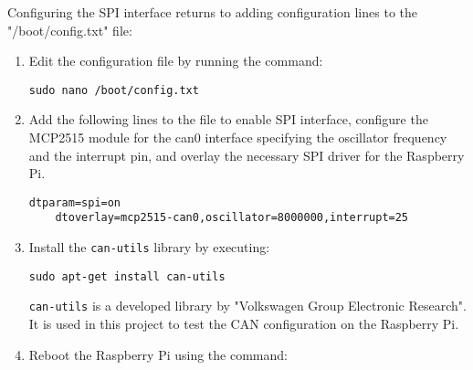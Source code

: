 Configuring the SPI interface returns to adding configuration lines to the "/boot/config.txt" file:
\begin{enumerate}
    \item Edit the configuration file by running the command:
    \begin{adjustwidth}{2em}{0pt}
    \begin{lstlisting}[backgroundcolor=\color{mygray}]
    sudo nano /boot/config.txt
    \end{lstlisting}
    \captionsetup{type=lstlisting}
    \label{lst:nano config}
    \end{adjustwidth}
    
    \item Add the following lines to the file to enable SPI interface, configure the MCP2515 module for the can0 interface specifying the oscillator frequency and the interrupt pin, and overlay the necessary SPI driver for the Raspberry Pi.
    
    \begin{adjustwidth}{2em}{0pt}
    \begin{lstlisting}[backgroundcolor=\color{mygray}]
    dtparam=spi=on 
    dtoverlay=mcp2515-can0,oscillator=8000000,interrupt=25
    \end{lstlisting}
    \captionsetup{type=lstlisting}
    \label{lst:spi config}
    \end{adjustwidth}

    \item Install the \texttt{can-utils} library by executing:
    
    \begin{adjustwidth}{2em}{0pt}
    \begin{lstlisting}[backgroundcolor=\color{mygray}]
    sudo apt-get install can-utils
    \end{lstlisting}
    \captionsetup{type=lstlisting}
    \label{lst:install can-utils}
    \end{adjustwidth}
    
    \texttt{can-utils} is a developed library by "Volkswagen Group Electronic Research". It is used in this project to test the CAN configuration on the Raspberry Pi.
    
    \item Reboot the Raspberry Pi using the command:


\end{enumerate}
